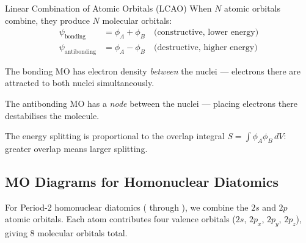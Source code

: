 \documentclass[12pt, a4paper]{book}
\begin{document}
\begin{center}
\end{center}

\begin{namedconcept}{Linear Combination of Atomic Orbitals (LCAO)}
When $N$ atomic orbitals combine, they produce $N$ molecular orbitals:
\begin{align*}
  \psi_\text{bonding}     &= \phi_A + \phi_B
    \quad \text{(constructive, lower energy)} \\
  \psi_\text{antibonding} &= \phi_A - \phi_B
    \quad \text{(destructive, higher energy)}
\end{align*}

The bonding MO has electron density \emph{between} the nuclei
--- electrons there are attracted to both nuclei simultaneously.

The antibonding MO has a \emph{node} between the nuclei
--- placing electrons there destabilises the molecule.

The energy splitting is proportional to the overlap integral
$S = \int \phi_A \phi_B\, dV$: greater overlap means larger splitting.
\end{namedconcept}

\subsection{MO Diagrams for Homonuclear Diatomics}

For Period-2 homonuclear diatomics ( through ),
we combine the $2s$ and $2p$ atomic orbitals.
Each atom contributes four valence orbitals ($2s$, $2p_x$, $2p_y$, $2p_z$),
giving 8 molecular orbitals total.
\end{document}

